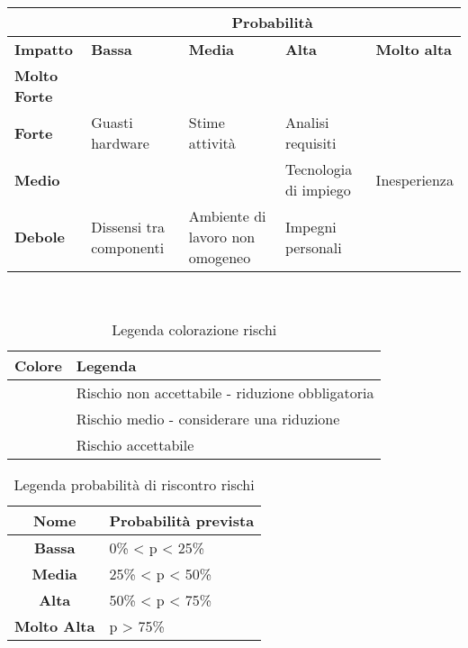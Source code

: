 \documentclass{scalatekids-article}
\begin{document}
\begin{table}[H]
  \centering
  \begin{tabular}{|m{2cm}|m{3cm}|m{3cm}|m{3cm}|m{3cm}|}
    \hline
    & \multicolumn{4}{|c|}{\textbf{Probabilità}}\\
    \hline
    \bf Impatto & \bf Bassa & \bf Media & \bf Alta & \textbf{Molto alta} \\
    \hline
    \bf Molto Forte & \cellcolor{red!50} & \cellcolor{red!50} & \cellcolor{red!50} &\cellcolor{red!50} \\
    \hline
    \bf Forte & \cellcolor{yellow!50}Guasti hardware & \cellcolor{yellow!50}Stime attività & \cellcolor{red!50}Analisi requisiti &\cellcolor{red!50}\\[8pt]
    \hline
    \bf Medio & \cellcolor{green!50} & \cellcolor{yellow!50} &\cellcolor{yellow!50}Tecnologia di impiego &\cellcolor{red!50}Inesperienza \\[8pt]
    \hline
    \bf Debole & \cellcolor{green!50}Dissensi tra componenti & \cellcolor{green!50}Ambiente di lavoro non omogeneo &\cellcolor{yellow!50}Impegni personali &\cellcolor{yellow!50} \\
    \hline
  \end{tabular} \\
\end{table}
\begin{table}[H]
  \centering
  \caption{Legenda colorazione rischi}
  \begin{tabular}{|c|l|}
    \hline \bf Colore & \bf Legenda \\
    \hline \cellcolor{red! 50} & Rischio non accettabile - riduzione obbligatoria \\
    \hline \cellcolor{yellow! 50} & Rischio medio - considerare una riduzione \\
    \hline \cellcolor{green! 50} & Rischio accettabile \\
    \hline
  \end{tabular}
\end{table}
\begin{table}[H]
  \centering
  \caption{Legenda probabilità di riscontro rischi}
  \begin{tabular}{|c|l|}
    \hline \bf Nome & \bf Probabilità prevista \\
    \hline \textbf{Bassa} & 0\% < p < 25\% \\
    \hline \textbf{Media} & 25\% < p < 50\% \\
    \hline \textbf{Alta} & 50\% < p < 75\% \\
    \hline \textbf{Molto Alta} & p > 75\% \\
    \hline
  \end{tabular}
\end{table}
\end{document}
